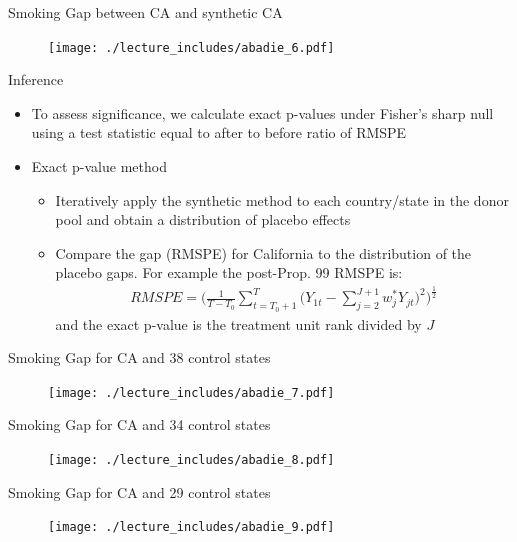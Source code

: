 \documentclass{beamer}
\begin{document}
\begin{frame}{Smoking Gap between CA and synthetic CA}
	
	\begin{figure}
	\texttt{[image: ./lecture\_includes/abadie\_6.pdf]}
	\end{figure}
\end{frame}

\begin{frame}{Inference}
	
	\begin{itemize}
	\item To assess significance, we calculate exact p-values under Fisher's sharp null using a test statistic equal to after to before ratio of RMSPE
	\item Exact p-value method
		\begin{itemize}
		\item Iteratively apply the synthetic method to each country/state in the donor pool and obtain a distribution of placebo effects
		\item Compare the gap (RMSPE) for California to the distribution of the placebo gaps. For example the post-Prop. 99 RMSPE is: 
			\begin{eqnarray*}
			RMSPE = \bigg(\frac{1}{T-T_0} \sum_{t=T_0+1}^T \bigg(Y_{1t} - \sum_{j=2}^{J+1} w_j^* Y_{jt}\bigg)^2 \bigg)^{\frac{1}{2}}
			\end{eqnarray*}and the exact p-value is the treatment unit rank divided by $J$
		\end{itemize}
	\end{itemize}
\end{frame}

\begin{frame}{Smoking Gap for CA and 38 control states}
	
	\begin{figure}
	\texttt{[image: ./lecture\_includes/abadie\_7.pdf]}
	\end{figure}
\end{frame}

\begin{frame}{Smoking Gap for CA and 34 control states}
	
	\begin{figure}
	\texttt{[image: ./lecture\_includes/abadie\_8.pdf]}
	\end{figure}
\end{frame}

\begin{frame}{Smoking Gap for CA and 29 control states}
	
	\begin{figure}
	\texttt{[image: ./lecture\_includes/abadie\_9.pdf]}
	\end{figure}
\end{frame}
\end{document}

